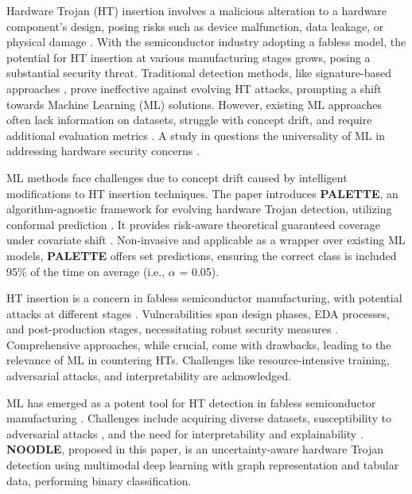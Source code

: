\begingroup
\RaggedRight

Hardware Trojan (HT) insertion involves a malicious alteration to a hardware component's design, posing risks such as device malfunction, data leakage, or physical damage \cite{francq2015introduction}. With the semiconductor industry adopting a fabless model, the potential for HT insertion at various manufacturing stages grows, posing a substantial security threat. Traditional detection methods, like signature-based approaches \cite{gbade2014signature}, prove ineffective against evolving HT attacks, prompting a shift towards Machine Learning (ML) solutions. However, existing ML approaches often lack information on datasets, struggle with concept drift, and require additional evaluation metrics \cite{285613}. A study in \cite{quiring2022and} questions the universality of ML in addressing hardware security concerns \cite{liu2021two}.

ML methods face challenges due to concept drift caused by intelligent modifications to HT insertion techniques. The paper introduces \textbf{PALETTE}, an algorithm-agnostic framework for evolving hardware Trojan detection, utilizing conformal prediction \cite{shafer2008tutorial}. It provides risk-aware theoretical guaranteed coverage under covariate shift \cite{tibshirani2019conformal}. Non-invasive and applicable as a wrapper over existing ML models, \textbf{PALETTE} offers set predictions, ensuring the correct class is included 95\% of the time on average (i.e., $\alpha$ = 0.05).

HT insertion is a concern in fabless semiconductor manufacturing, with potential attacks at different stages \cite{salmani2017hardware, Regazzoni:HTDetection, Guin:HTDetection, Salmani:HTDetection}. Vulnerabilities span design phases, EDA processes, and post-production stages, necessitating robust security measures \cite{narasimhan2011tesr, muralidhar2021contrastive, chang2023supplier, panduro2023effective, monjur2023hardware}. Comprehensive approaches, while crucial, come with drawbacks, leading to the relevance of ML in countering HTs. Challenges like resource-intensive training, adversarial attacks, and interpretability are acknowledged.

ML has emerged as a potent tool for HT detection in fabless semiconductor manufacturing \cite{gubbi2023hardware, huang2020survey, liakos2019machine, koblah2023survey, koylu2023survey}. Challenges include acquiring diverse datasets, susceptibility to adversarial attacks \cite{west2023towards}, and the need for interpretability and explainability \cite{li2022interpretable, caruana2020intelligible}. \textbf{NOODLE}, proposed in this paper, is an uncertainty-aware hardware Trojan detection using multimodal deep learning with graph representation and tabular data, performing binary classification.

